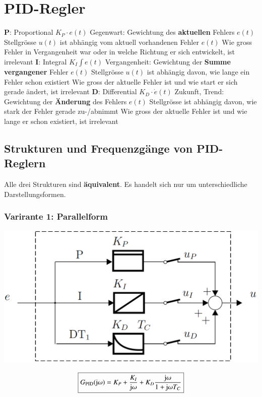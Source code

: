 \section{PID-Regler}

\begin{outline}
    \1 \textbf{P}: Proportional $K_P \cdot e(t)$
        \2 Gegenwart: Gewichtung des \textbf{aktuellen} Fehlers $e(t)$
            \3 Stellgrösse $u(t)$ ist abhängig vom aktuell vorhandenen Fehler $e(t)$
            \3 Wie gross Fehler in Vergangenheit war oder in welche Richtung er sich entwickelt, ist irrelevant
    \1 \textbf{I}: Integral $K_I \int e(t)$
        \2 Vergangenheit: Gewichtung der \textbf{Summe vergangener} Fehler $e(t)$
            \3  Stellgrösse $u(t)$ ist abhängig davon, wie lange ein Fehler schon existiert
            \3 Wie gross der aktuelle Fehler ist und wie start er sich gerade ändert, ist irrelevant
    \1 \textbf{D}: Differential $K_D \cdot \dot{e}(t)$
        \2 Zukunft, Trend: Gewichtung der \textbf{Änderung} des Fehlers $e(t)$
            \3 Stellgrösse ist abhängig davon, wie stark der Fehler gerade zu-/abnimmt
            \3 Wie gross der aktuelle Fehler ist und wie lange er schon existiert, ist irrelevant
\end{outline}


\subsection{Strukturen und Frequenzgänge von PID-Reglern}
\label{Strukturen PID-Regler}

Alle drei Strukturen sind \textbf{äquivalent}. Es handelt sich nur um unterschiedliche Darstellungsformen.


\subsubsection{Varirante 1: Parallelform}
\label{PID-Regler Parallelform}

\begin{minipage}[c]{0.45\columnwidth}
    \includegraphics[width=\columnwidth]{images/pid_regler_aufbau.png}
\end{minipage}
\hfill
\begin{minipage}[c]{0.48\columnwidth}
    $$ \boxed{ G_{\rm PID}(\mathrm{j} \omega) = K_P + \frac{K_I}{\mathrm{j} \omega} + K_D \frac{\mathrm{j} \omega}{1 + \mathrm{j} \omega T_C} } $$
\end{minipage}


